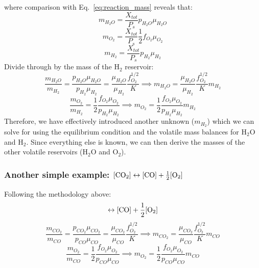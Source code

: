 where comparison with Eq.~\ref{eq:reaction_mass} reveals that:
\begin{equation}
m_{H_2O} = \frac{X_{tot}}{P_s} p_{H_2O} \mu_{H_2O}
\end{equation}
\begin{equation}
m_{O_2} = \frac{X_{tot}}{P_s} \frac{1}{2} f_{O_2} \mu_{O_2}
\end{equation}
\begin{equation}
m_{H_2} = \frac{X_{tot}}{P_s} p_{H_2} \mu_{H_2}
\end{equation}
Divide through by the mass of the H$_2$ reservoir:
\begin{equation}
\frac{m_{H_2O}}{m_{H_2}} = \frac{p_{H_2O} \mu_{H_2O}}{p_{H_2} \mu_{H_2} } = \frac{\mu_{H_2O}}{\mu_{H_2}} \frac{f_{O_2}^{1/2}}{K} \implies m_{H_2O} = \frac{\mu_{H_2O}}{\mu_{H_2}} \frac{f_{O_2}^{1/2}}{K} m_{H_2}
\end{equation}
\begin{equation}
\frac{m_{O_2}}{m_{H_2}} = \frac{1}{2} \frac{ f_{O_2} \mu_{O_2}}{p_{H_2} \mu_{H_2}} \implies m_{O_2} = \frac{1}{2} \frac{ f_{O_2} \mu_{O_2}}{p_{H_2} \mu_{H_2}} m_{H_2}
\end{equation}
Therefore, we have effectively introduced another unknown ($m_{H_2}$) which we can solve for using the equilibrium condition and the volatile mass balances for H$_2$O and H$_2$.  Since everything else is known, we can then derive the masses of the other volatile reservoirs (H$_2$O and O$_2$).
\subsubsection{Another simple example: $[\rm{CO}_2]\leftrightarrow [\rm{CO}] + \frac{1}{2} [\rm{O}_2]$}
Following the methodology above:
\begin{equation}
    [\rm{CO}_2]\leftrightarrow [\rm{CO}] + \frac{1}{2} [\rm{O}_2]
    \label{eq:reactionCO2}
\end{equation}
\begin{equation}
\frac{m_{CO_2}}{m_{CO}} = \frac{p_{CO_2} \mu_{CO_2}}{p_{CO} \mu_{CO} } = \frac{\mu_{CO_2}}{\mu_{CO}} \frac{f_{O_2}^{1/2}}{K} \implies m_{CO_2} = \frac{\mu_{CO_2}}{\mu_{CO}} \frac{f_{O_2}^{1/2}}{K} m_{CO}
\end{equation}
\begin{equation}
\frac{m_{O_2}}{m_{CO}} = \frac{1}{2} \frac{ f_{O_2} \mu_{O_2}}{p_{CO} \mu_{CO}} \implies m_{O_2} = \frac{1}{2} \frac{ f_{O_2} \mu_{O_2}}{p_{CO} \mu_{CO}} m_{CO}
\end{equation}
